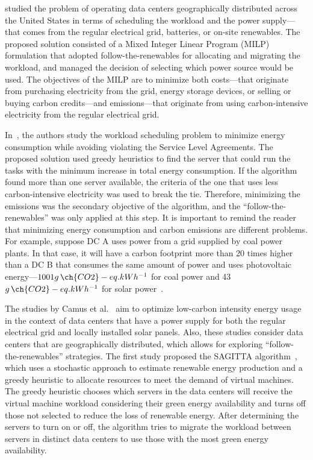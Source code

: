 \citet{RUIZDUARTE2023_operation_dcs_renewables} studied the problem of operating data centers geographically distributed across the United States in terms of scheduling the workload and the power supply---that comes from the regular electrical grid, batteries, or on-site renewables. The proposed solution consisted of a Mixed Integer Linear Program (MILP) formulation that adopted follow-the-renewables for allocating and migrating the workload, and managed the decision of selecting which power source would be used. The objectives of the MILP are to minimize both costs---that originate from purchasing electricity from the grid, energy storage devices, or selling or buying carbon credits---and  emissions---that originate from using carbon-intensive electricity from the regular electrical grid.

In~\citet{KHODAYARSERESHT2023_energycarbonaware_vm}, the authors study the workload scheduling problem to minimize energy consumption while avoiding violating the Service Level Agreements. The proposed solution used greedy heuristics to find the server that could run the tasks with the minimum increase in total energy consumption. If the algorithm found more than one server available, the criteria of the one that uses less carbon-intensive electricity was used to break the tie. Therefore, minimizing the emissions was the secondary objective of the algorithm, and the ``follow-the-renewables'' was only applied at this step. It is important to remind the reader that minimizing energy consumption and carbon emissions are different problems. For example, suppose DC A uses power from a grid supplied by coal power plants. In that case, it will have a carbon footprint more than 20 times higher than a DC B that consumes the same amount of power and uses photovoltaic energy---$1001 g\,\ch{CO2}-eq.kWh^{-1}$ for coal power and 43  $g\,\ch{CO2}-eq.kWh^{-1}$ for solar power~\cite{nrel_lifecycle_2021}. 

The studies by Camus et al.~\cite{SCORPIOUS,NEMESIS,SAGITTA} aim to optimize low-carbon intensity energy usage in the context of data centers that have a power supply for both the regular electrical grid and locally installed solar panels. Also, these studies consider data centers that are geographically distributed, which allows for exploring ``follow-the-renewables'' strategies. The first study proposed the SAGITTA algorithm~\citep{SAGITTA}, which uses a stochastic approach to estimate renewable energy production and a greedy heuristic to allocate resources to meet the demand of virtual machines. The greedy heuristic chooses which servers in the data centers will receive the virtual machine workload considering their green energy availability and turns off those not selected to reduce the loss of renewable energy. After determining the servers to turn on or off, the algorithm tries to migrate the workload between servers in distinct data centers to use those with the most green energy availability. 

